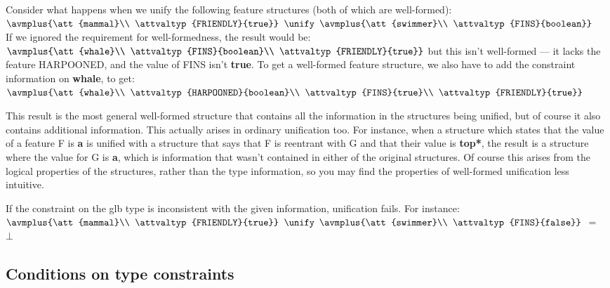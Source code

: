 \documentclass[12pt]{report}
\begin{document}
Consider what happens when we unify the following
feature structures (both of which are well-formed):\\
{\tiny $\avmplus{\att{mammal}\\
\attvaltyp{FRIENDLY}{true}}$} $\unify$
{\tiny
$\avmplus{\att{swimmer}\\
\attvaltyp{FINS}{boolean}}$}\\
If we ignored the requirement for
well-formedness, the result would be:\\
{\tiny $\avmplus{\att{whale}\\
\attvaltyp{FINS}{boolean}\\
\attvaltyp{FRIENDLY}{true}}$}
but this isn't well-formed --- it lacks the feature 
HARPOONED, and the value of FINS isn't {\bf true}.
To get a well-formed feature
structure, we also have to add the constraint information
on {\bf whale}, to get:\\
{\tiny $\avmplus{\att{whale}\\
\attvaltyp{HARPOONED}{boolean}\\
\attvaltyp{FINS}{true}\\
\attvaltyp{FRIENDLY}{true}}$}

This result is the most general well-formed structure that
contains all the information in the structures being unified,
but of course it also contains additional information.  This actually arises
in ordinary unification too.  For instance, when
a structure which states that the value of a feature F is {\bf a} is unified
with a structure that says that F is reentrant with G and that their value
is {\bf *top*}, the result is a structure where the value for G is
{\bf a}, which is information that wasn't contained in either
of the original structures.  Of course this arises from the
logical properties of the structures, rather than the type
information, so you may find the properties of well-formed unification
less intuitive.  

If the constraint on the glb type is inconsistent with
the given information, unification fails.
For instance:\\
{\tiny $\avmplus{\att{mammal}\\
\attvaltyp{FRIENDLY}{true}}$} $\unify$
{\tiny
$\avmplus{\att{swimmer}\\
\attvaltyp{FINS}{false}}$} $=$ $\bot$\\

\subsection{Conditions on type constraints}
\label{tc}
\end{document}
